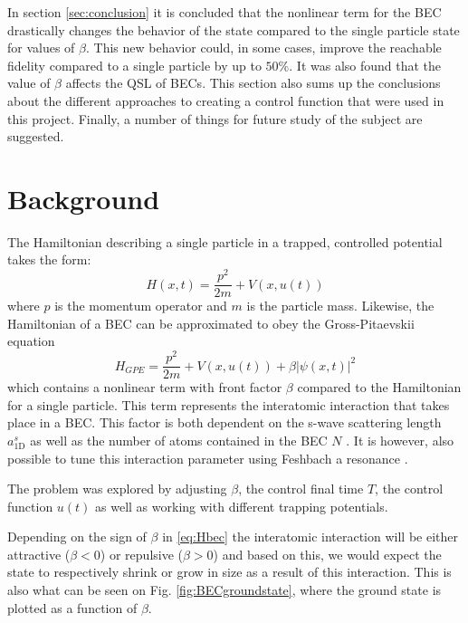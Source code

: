 \documentclass[aps,pra,reprint,superscriptaddress]{revtex4-1}
\begin{document}
In section \ref{sec:conclusion} it is concluded that the nonlinear term for the BEC drastically changes the behavior of the state compared to the single particle state for values of $\beta$. This new behavior could, in some cases, improve the reachable fidelity compared to a single particle by up to $50\%$. It was also found that the value of $\beta$ affects the QSL of BECs. This section also sums up the conclusions about the different approaches to creating a control function that were used in this project. Finally, a number of things for future study of the subject are suggested.

\section{\label{sec:back}Background}
The Hamiltonian describing a single particle in a trapped, controlled potential takes the form:
\begin{equation}
	H(x,t) = \frac{p^2}{2m} + V(x,u(t))
\end{equation}
where $p$ is the momentum operator and $m$ is the particle mass. Likewise, the Hamiltonian of a BEC can be approximated to obey the Gross-Pitaevskii equation
\begin{equation}
	H_{GPE} = \frac{p^2}{2m} + V(x,u(t)) + \beta |\psi(x,t)|^2
	\label{eq:Hbec}
\end{equation}
which contains a nonlinear term with front factor $\beta$ compared to the Hamiltonian for a single particle. This term represents the interatomic interaction that takes place in a BEC. This factor is both dependent on the s-wave scattering length $a_{\text{1D}}^s$ as well as the number of atoms contained in the BEC $N$ \cite{Schmiedmayer}. It is however, also possible to tune this interaction parameter using Feshbach a resonance \cite{Feshbach}.


The problem was explored by adjusting $\beta$, the control final time $T$, the control function $u(t)$ as well as working with different trapping potentials.

Depending on the sign of $\beta$ in \eqref{eq:Hbec} the interatomic interaction will be either attractive ($\beta<0$) or repulsive ($\beta>0$) and based on this, we would expect the state to respectively shrink or grow in size as a result of this interaction. This is also what can be seen on Fig. \ref{fig:BECgroundstate}, where the ground state is plotted as a function of $\beta$.
\end{document}
